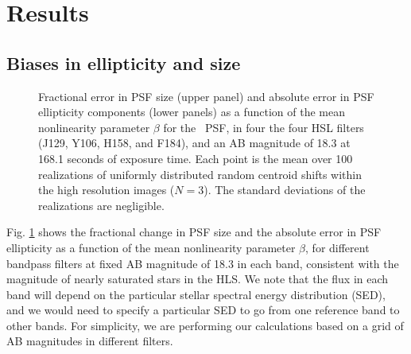 \documentclass[preprint]{aastex}
\begin{document}
\section{Results}
\label{results}
\subsection{Biases in ellipticity and size}

\begin{figure}[!h]
\centering
{}
\caption{Fractional error in PSF size (upper panel) and absolute error in PSF ellipticity components (lower panels) as a function of the mean nonlinearity parameter $\beta$ for the \wfa\ PSF, in four the four HSL filters (J129, Y106, H158, and F184), and an AB magnitude of 18.3 at 168.1 seconds of exposure time. 
Each point is the mean over 100 realizations of uniformly distributed random centroid shifts within the high resolution images ($N=3$).
The standard deviations of the realizations are negligible.}
\label{f2}
\end{figure}

Fig. \ref{f2} shows the fractional change in PSF size and the absolute error in PSF ellipticity as a function of the mean nonlinearity parameter $\beta$, for different bandpass filters at fixed AB magnitude of 18.3 in each band, consistent with the magnitude of nearly saturated stars in the HLS. We note that the flux in each band will depend on the particular stellar spectral energy distribution (SED), and we would need to specify a particular SED to go from one reference band to other bands. For simplicity, we are performing our calculations based on a grid of AB magnitudes in different filters. 
\end{document}
